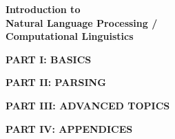 \documentclass{article}
\def\part#1#2{\vfil\Huge\textbf{PART #1: #2}}
\begin{document}
\vfil\LARGE\textbf{Introduction to\\ Natural Language Processing /\\
  Computational Linguistics}\vfil





\part{I}{BASICS}






\part{II}{PARSING}







\part{III}{ADVANCED TOPICS}





\part{IV}{APPENDICES}





\end{document}
